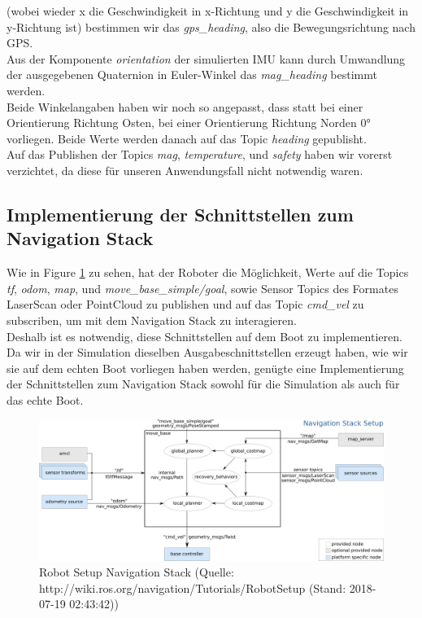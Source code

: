 \documentclass[conference]{IEEEtran}
\begin{document}
(wobei wieder x die Geschwindigkeit in x-Richtung und y die Geschwindigkeit in y-Richtung ist) bestimmen wir das \textit{gps\_heading}, also die Bewegungsrichtung nach GPS. \\
Aus der Komponente \textit{orientation} der simulierten IMU kann durch Umwandlung der ausgegebenen Quaternion in Euler-Winkel das \textit{mag\_heading} bestimmt werden.\\
Beide Winkelangaben haben wir noch so angepasst, dass statt bei einer Orientierung Richtung Osten, bei einer Orientierung Richtung Norden 0° vorliegen. Beide Werte werden danach auf das Topic \textit{heading} gepublisht.\\
Auf das Publishen der Topics \textit{mag}, \textit{temperature}, und \textit{safety} haben wir vorerst verzichtet, da diese für unseren Anwendungsfall nicht notwendig waren.

\subsection{Implementierung der Schnittstellen zum Navigation Stack}
Wie in Figure \ref{nav} zu sehen, hat der Roboter die Möglichkeit, Werte auf die Topics \textit{tf}, \textit{odom}, \textit{map}, und \textit{move\_base\_simple/goal}, sowie Sensor Topics des Formates LaserScan oder PointCloud zu publishen und auf das Topic \textit{cmd\_vel} zu subscriben, um mit dem Navigation Stack zu interagieren.\\
Deshalb ist es notwendig, diese Schnittstellen auf dem Boot zu implementieren. Da wir in der Simulation dieselben Ausgabeschnittstellen erzeugt haben, wie wir sie auf dem echten Boot vorliegen haben werden, genügte eine Implementierung der Schnittstellen zum Navigation Stack sowohl für die Simulation als auch für das echte Boot.
\begin{figure}
	\includegraphics[width=\linewidth]{overview_tf.png}
	\caption{Robot Setup Navigation Stack (Quelle: http://wiki.ros.org/navigation/Tutorials/RobotSetup (Stand: 2018-07-19 02:43:42))}
	\label{nav}
\end{figure}
\end{document}

